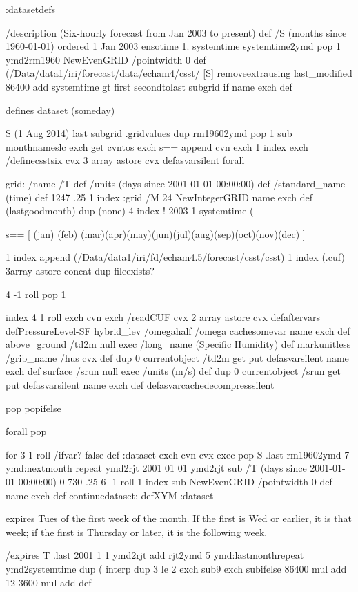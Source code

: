 \begin{ingrid}
:datasetdefs

/description (Six-hourly forecast from Jan 2003 to present) def
/S (months since 1960-01-01) ordered
1 Jan 2003 ensotime
1.
systemtime systemtime2ymd pop 1
ymd2rm1960
NewEvenGRID
/pointwidth 0 def
{
(/Data/data1/iri/forecast/data/echam4/csst/%
[S]
} removeextrausing
last_modified 86400 add
systemtime gt 
{ first secondtolast subgrid} if
name exch def
\end{ingrid}
defines dataset (someday)
\begin{ingrid}
S (1 Aug 2014) last subgrid .gridvalues
{
dup rm19602ymd pop
1 sub monthnameslc exch get cvntos exch s== append cvn exch 1 index exch /definecsstsix cvx 3 array astore cvx defasvarsilent
} forall
\end{ingrid}
\begin{ingrid}
grid:
/name /T def
/units (days since 2001-01-01 00:00:00) def
/standard_name (time) def
1247 
.25 1 index
:grid
/M 24 NewIntegerGRID name exch def
(lastgoodmonth)  dup (none) 4 index !
2003 1 
systemtime (%
{
s==
[ (jan) (feb) (mar)(apr)(may)(jun)(jul)(aug)(sep)(oct)(nov)(dec) ]
{
1 index append 
(/Data/data1/iri/fd/echam4.5/forecast/csst/csst) 1 index (.cuf) 3array astore concat
dup fileexists?
{
4 -1 roll pop 1 

index 4 1 roll
 exch cvn exch /readCUF cvx 2 array astore cvx 
{
defaftervars
defPressureLevel-SF
hybrid_lev /omegahalf /omega cachesomevar
name exch def
above_ground
/td2m
{null  exec
  /long_name (Specific Humidity) def
  markunitless
/grib_name /hus cvx def
}
dup 0 currentobject 
/td2m get
put
defasvarsilent
name exch def
surface
/srun
{null  exec
/units (m/s) def
}
dup 0 currentobject 
/srun get
put
defasvarsilent
name exch def
} defasvarcachedecompresssilent
} 
{pop pop}ifelse
} forall
pop
} for
3 1 roll
/ifvar? false def
:dataset
exch
cvn cvx exec
pop
S .last
rm19602ymd 
7 {ymd:nextmonth} repeat
ymd2rjt
2001 01 01 ymd2rjt sub
/T
(days since 2001-01-01 00:00:00)
0
730 .25 6 -1 roll 1 index sub
NewEvenGRID 
/pointwidth 0 def
name exch def
continuedataset:
defXYM
:dataset
\end{ingrid}
expires Tues of the first week of the month.  If the first is Wed or earlier, it is that week; if the first is Thursday or later, it is the following week.
\begin{ingrid}
/expires T .last
    2001
     1 1 ymd2rjt
     add
    rjt2ymd
      5 {ymd:lastmonth}repeat
      ymd2systemtime
    dup
     (%
     interp
     dup
      3 le
      {2 exch sub}{9 exch sub}ifelse
     86400 mul
     add
    12
     3600 mul
     add
    def
\end{ingrid}




